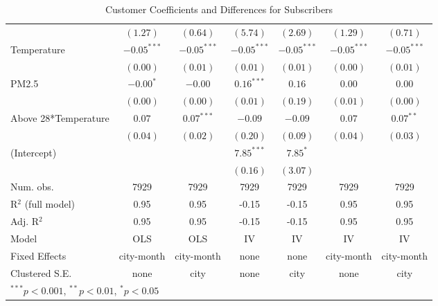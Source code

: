 \documentclass[12pt,letter paper]{article}
\begin{document}
\begin{table}[H]
\begin{center}
\begin{tabular}{l c c c c c c }
                                           & $(1.27)$      & $(0.64)$      & $(5.74)$      & $(2.69)$      & $(1.29)$      & $(0.71)$      \\
\quad Temperature            & $-0.05^{***}$ & $-0.05^{***}$ & $-0.05^{***}$ & $-0.05^{***}$ & $-0.05^{***}$ & $-0.05^{***}$ \\
                                           & $(0.00)$      & $(0.01)$      & $(0.01)$      & $(0.01)$      & $(0.00)$      & $(0.01)$      \\
\quad PM2.5                               & $-0.00^{*}$   & $-0.00$       & $0.16^{***}$ & $0.16$       & $0.00$        & $0.00$        \\
                                           & $(0.00)$      & $(0.00)$      & $(0.01)$      & $(0.19)$      & $(0.01)$      & $(0.00)$      \\            
\quad Above 28*Temperature & $0.07$        & $0.07^{***}$  & $-0.09$       & $-0.09$       & $0.07$        & $0.07^{**}$   \\
                                           & $(0.04)$      & $(0.02)$      & $(0.20)$      & $(0.09)$      & $(0.04)$      & $(0.03)$      \\
(Intercept)                                &               &               & $7.85^{***}$  & $7.85^{*}$    &               &               \\
                                           &               &               & $(0.16)$      & $(3.07)$      &               &               \\
\hline
Num. obs.                                  & 7929          & 7929          & 7929          & 7929          & 7929          & 7929          \\
R$^2$ (full model)                         & 0.95          & 0.95          & -0.15         & -0.15         & 0.95          & 0.95          \\
Adj. R$^2$                  & 0.95          & 0.95          & -0.15         & -0.15         & 0.95          & 0.95          \\
Model & OLS & OLS & IV & IV & IV & IV \\
Fixed Effects & city-month & city-month & none & none & city-month & city-month \\
Clustered S.E. & none & city & none & city & none & city \\
\hline
\multicolumn{7}{l}{\scriptsize{$^{***}p<0.001$, $^{**}p<0.01$, $^*p<0.05$}}
\end{tabular}
\caption{Customer Coefficients and Differences for Subscribers}
\label{table:coefficients}
\end{center}
\end{table}
\egroup
\end{document}
